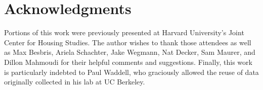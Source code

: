 \documentclass[11pt,letterpaper]{article}
\begin{document}

\section*{Acknowledgments}

Portions of this work were previously presented at Harvard University’s Joint Center for Housing Studies. The author wishes to thank those attendees as well as Max Besbris, Ariela Schachter, Jake Wegmann, Nat Decker, Sam Maurer, and Dillon Mahmoudi for their helpful comments and suggestions. Finally, this work is particularly indebted to Paul Waddell, who graciously allowed the reuse of data originally collected in his lab at UC Berkeley.


\setlength{\bibsep}{0.00cm plus 0.05cm} %


\end{document}
